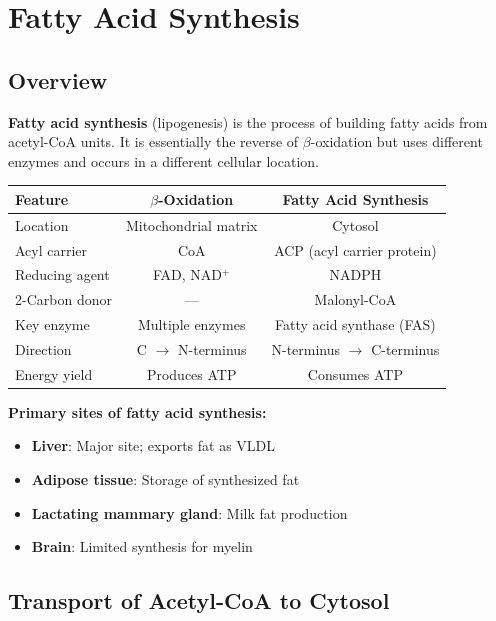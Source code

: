 \section{Fatty Acid Synthesis}

\subsection{Overview}

\begin{definition}
\textbf{Fatty acid synthesis} (lipogenesis) is the process of building fatty acids from acetyl-CoA units. It is essentially the reverse of $\beta$-oxidation but uses different enzymes and occurs in a different cellular location.
\end{definition}

\begin{center}
\begin{tabular}{lcc}
\toprule
\textbf{Feature} & \textbf{$\beta$-Oxidation} & \textbf{Fatty Acid Synthesis} \\
\midrule
Location & Mitochondrial matrix & Cytosol \\
Acyl carrier & CoA & ACP (acyl carrier protein) \\
Reducing agent & FAD, NAD$^+$ & NADPH \\
2-Carbon donor & — & Malonyl-CoA \\
Key enzyme & Multiple enzymes & Fatty acid synthase (FAS) \\
Direction & C
$\rightarrow$ N-terminus & N-terminus $\rightarrow$ C-terminus \\
Energy yield & Produces ATP & Consumes ATP \\
\bottomrule
\end{tabular}
\end{center}

\textbf{Primary sites of fatty acid synthesis:}
\begin{itemize}
    \item \textbf{Liver}: Major site; exports fat as VLDL
    \item \textbf{Adipose tissue}: Storage of synthesized fat
    \item \textbf{Lactating mammary gland}: Milk fat production
    \item \textbf{Brain}: Limited synthesis for myelin
\end{itemize}

\subsection{Transport of Acetyl-CoA to Cytosol}

